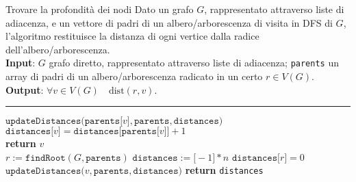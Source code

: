 \documentclass[a4paper, 12pt]{report}
\begin{document}
    \begin{framedalgo}[breakable]{Trovare la profondità dei nodi}
        Dato un grafo $G$, rappresentato attraverso liste di adiacenza, e un vettore di padri di un albero/arborescenza di visita in DFS di $G$, l'algoritmo restituisce la distanza di ogni vertice dalla radice dell'albero/arborescenza.\\
        \textbf{Input}: $G$ grafo diretto, rappresentato attraverso liste di adiacenza; \texttt{parents} un array di padri di un albero/arborescenza radicato in un certo $r \in V(G)$.\\
        \textbf{Output}: $\forall v \in V(G) \quad \mathrm{dist}(r, v)$.

        \hrule
        \begin{algorithmic}[1]
                 
                    \State $\texttt{updateDistances(parents[}v\texttt{]}, \texttt{parents}, \texttt{distances)}$
                \EndIf
                \State $\texttt{distances[}v\texttt{]} = \texttt{distances[parents[}v\texttt{]]} + 1$
            \EndFunction
            \\
                        \State \textbf{return} $v$
                    \EndIf
                \EndFor
            \EndFunction
            \\
                \State $r := \texttt{findRoot}(G, \texttt{parents})$
                \State $\texttt{distances}:=\texttt{[}-1\texttt{]} * n$
                \State $\texttt{distances[}r\texttt{]} = 0$
                     
                        \State $\texttt{updateDistances(}v, \texttt{parents}, \texttt{distances)}$
                    \EndIf
                \EndFor
                \State \textbf{return} \texttt{distances}
            \EndFunction
        \end{algorithmic}
    \end{framedalgo}
\end{document}
